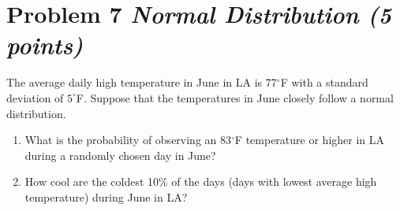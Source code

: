 \documentclass[11pt,twoside]{article}
\newcommand{\pts}[1]{\marginpar{ \small\hspace{0pt} \textit{[#1]} } }
\numberwithin{equation}{section}
\newcommand{\?}{\stackrel{?}{=}}
\begin{document}
\eject

\section*{Problem 7  \textit{Normal Distribution (5 points)}}
The average daily high temperature in June in LA is 77$^{\circ}$F with a standard deviation of $5^{\circ}$F.
Suppose that the temperatures in June closely follow a normal distribution.

\begin{enumerate}[\bf (a)]
\item What is the probability of observing an 83$^{\circ}$F temperature \pts{2} or higher in LA during a randomly chosen day in
  June?
 \vspace{40ex}

\item How cool are the coldest 10\% of the days \pts{3} (days with lowest average high temperature) during June in LA?
 
\end{enumerate}

\end{document}
